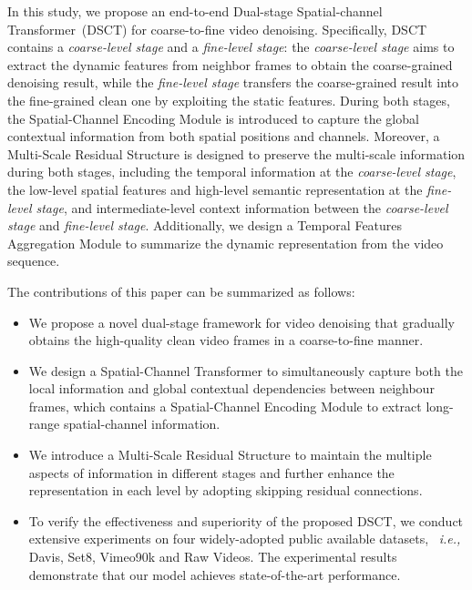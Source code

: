\documentclass[journal]{IEEEtran}
\begin{document}
In this study, we propose an end-to-end Dual-stage Spatial-channel Transformer~(DSCT) for coarse-to-fine video denoising. Specifically, DSCT contains a \emph{coarse-level stage} and a \emph{fine-level stage}: the \emph{coarse-level stage} aims to extract the dynamic features from neighbor frames to obtain the coarse-grained denoising result, while the \emph{fine-level stage} transfers the coarse-grained result into the fine-grained clean one by exploiting the static features. During both stages, the Spatial-Channel Encoding Module is introduced to capture the global contextual information from both spatial positions and channels. Moreover, a Multi-Scale Residual Structure is designed to preserve the multi-scale information during both stages, including the temporal information at the \emph{coarse-level stage}, the low-level spatial features and high-level semantic representation at the \emph{fine-level stage}, and intermediate-level context information between the \emph{coarse-level stage} and \emph{fine-level stage}. Additionally, we design a Temporal Features Aggregation Module to summarize the dynamic representation from the video sequence.


The contributions of this paper can be summarized as follows:

\begin{itemize}
\item We propose a novel dual-stage framework for video denoising that gradually obtains the high-quality clean video frames in a coarse-to-fine manner. 

\item We design a Spatial-Channel Transformer to simultaneously capture both the local information and global contextual dependencies between neighbour frames, which contains a Spatial-Channel Encoding Module to extract long-range spatial-channel information.

\item We introduce a Multi-Scale Residual Structure to maintain the multiple aspects of information in different stages and further enhance the representation in each level by adopting skipping residual connections.

\item To verify the effectiveness and superiority of the proposed DSCT, we conduct extensive experiments on four widely-adopted public available datasets, ~\emph{i.e.,} Davis, Set8, Vimeo90k and Raw Videos. The experimental results demonstrate that our model achieves state-of-the-art performance.
\end{itemize}
\end{document}
